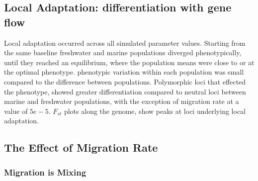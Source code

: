 \documentclass{article}
\begin{document}




\subsection{Local Adaptation: differentiation with gene flow}

Local adaptation occurred across all simulated parameter values.
Starting from the same baseline freshwater and marine populations diverged phenotypically, 
until they reached an equilibrium,
where the population means were close to or at the optimal phenotype. 
phenotypic variation within each population was small compared to the difference between populations.
Polymorphic loci that effected the phenotype,
showed greater differentiation compared to neutral loci between marine and freshwater populations, with the exception 
of migration rate at a value of $5e-5$. 
$F_{st}$ plots along the genome, show peaks at loci underlying local adaptation.



\subsection{The Effect of Migration Rate}

\subsubsection*{Migration is Mixing}

\end{document}

